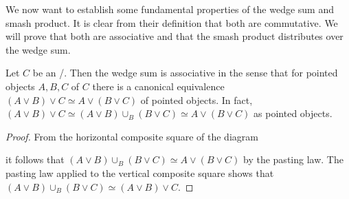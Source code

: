 We now want to establish some fundamental properties of the wedge sum and smash product.
It is clear from their definition that both are commutative.
We will prove that both are associative and that the smash product distributes over the wedge sum.
\begin{lemma}\label{lem:assocWedge}
    Let $C$ be an \inftytop/.
    Then the wedge sum is associative in the sense that for pointed objects $A,B,C$ of $C$ there is a canonical equivalence $(A\vee B)\vee C\simeq A\vee (B\vee C)$ of pointed objects.
    In fact, $(A\vee B)\vee C\simeq(A\vee B)\cup_{B}(B\vee C)\simeq A\vee (B\vee C)$ as pointed objects.
    \begin{proof}
        From the horizontal composite square of the diagram 
        \begin{center}
        \end{center}
        it follows that $(A\vee B)\cup_B(B\vee C)\simeq A\vee (B\vee C)$ by the pasting law. 
        The pasting law applied to the vertical composite square shows that $(A\vee B)\cup_B(B\vee C)\simeq (A\vee B)\vee C$.
    \end{proof}
\end{lemma}
